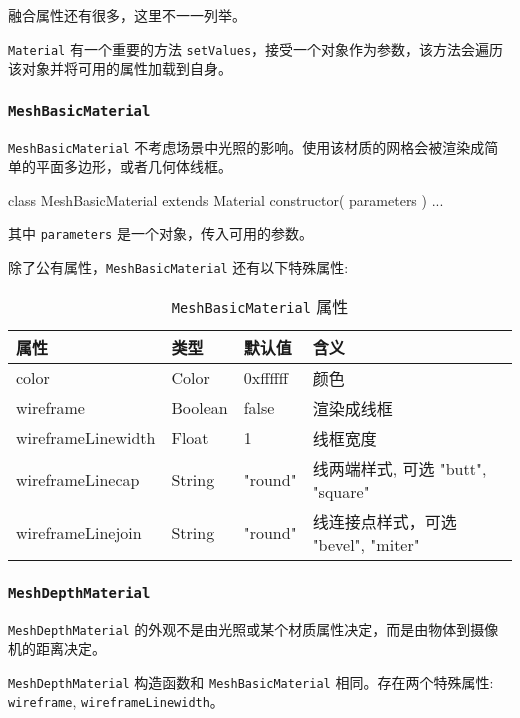 融合属性还有很多，这里不一一列举。

\texttt{Material} 有一个重要的方法 \texttt{setValues}，接受一个对象作为参数，该方法会遍历该对象并将可用的属性加载到自身。

\subsubsection*{\texttt{MeshBasicMaterial}}

\texttt{MeshBasicMaterial} 不考虑场景中光照的影响。使用该材质的网格会被渲染成简单的平面多边形，或者几何体线框。

\begin{JavaScript}
class MeshBasicMaterial extends Material {
	constructor( parameters )
  ... 
}
\end{JavaScript}

其中 \texttt{parameters} 是一个对象，传入可用的参数。

除了公有属性，\texttt{MeshBasicMaterial} 还有以下特殊属性:

\begin{table}[H]
  \centering
  \small
  \caption{\texttt{MeshBasicMaterial} 属性}
  \setlength{\tabcolsep}{4mm}
  \begin{tabular}{l|l|l|l}
    \toprule
    \textbf{属性} & \textbf{类型} & \textbf{默认值} & \textbf{含义} \\
    \midrule
    color & Color & 0xffffff & 颜色 \\
    wireframe & Boolean & false & 渲染成线框 \\
    wireframeLinewidth & Float & 1 & 线框宽度 \\
    wireframeLinecap & String & "round" & 线两端样式, 可选 "butt", "square" \\
    wireframeLinejoin & String & "round" & 线连接点样式，可选 "bevel", "miter" \\
    \bottomrule
  \end{tabular}
\end{table}

\subsubsection*{\texttt{MeshDepthMaterial}}

\texttt{MeshDepthMaterial} 的外观不是由光照或某个材质属性决定，而是由物体到摄像机的距离决定。

\texttt{MeshDepthMaterial} 构造函数和 \texttt{MeshBasicMaterial} 相同。存在两个特殊属性: \texttt{wireframe}, \texttt{wireframeLinewidth}。

